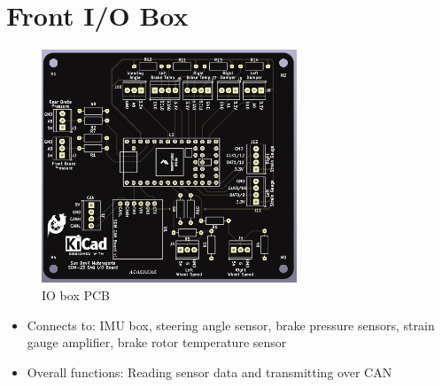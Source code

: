 \section{Front I/O Box}
\begin{figure}[H]
    \centering
    \includegraphics[width=3in]{images/pcbio.png}
    \caption{IO box PCB}
    \label{fig:pcbio}
\end{figure}
\begin{itemize}
    \item Connects to: IMU box, steering angle sensor, brake pressure sensors, strain gauge amplifier, brake rotor temperature sensor
    \item Overall functions: Reading sensor data and transmitting over CAN
\end{itemize}
